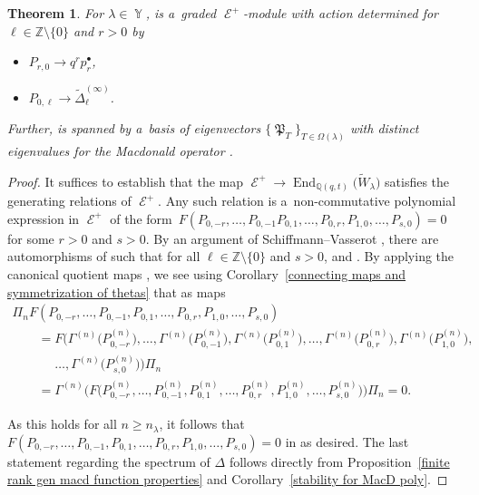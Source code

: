 \documentclass[pdftex]{sigma}
\numberwithin{equation}{section}
\newtheorem{Theorem}{Theorem}[section]
\theoremstyle{definition}
\DeclareMathOperator{\Par}{\mathbb{Y}}
\DeclareMathOperator{\sD}{\mathscr{D}}
\DeclareMathOperator{\MacD}{\mathfrak{P}}
\DeclareMathOperator{\sE}{\mathcal{E}}
\DeclareMathOperator{\End}{\mathrm{End}}
\begin{document}
\begin{Theorem} \label{positive EHA module}
 For $\lambda \in \Par$,  is a~graded $\sE^{+}$-module with action determined for $\ell \in \mathbb{Z}\setminus \{0\}$ and $r>0$ by
 \begin{itemize}
\itemsep=0pt
 \item $P_{r,0} \rightarrow q^{r} p_{r}^{\bullet}$,
 \item $P_{0,\ell} \rightarrow \widetilde{\Delta}_{\ell}^{(\infty)}$.
 \end{itemize}
 Further,  is spanned by a~basis of eigenvectors $\{ \MacD_{T}\}_{T \in \Omega(\lambda)}$ with distinct eigenvalues for the Macdonald operator .
\end{Theorem}
\begin{proof}
It suffices to establish that the map $\sE^{+} \rightarrow \End_{\mathbb{Q}(q,t)}\bigl(\widetilde{W}_{\lambda}\bigr)$ satisfies the generating relations of $\sE^{+}$. Any such relation is a~non-commutative polynomial expression in $\sE^{+}$ of the form~${ F(P_{0,-r},\dots, P_{0,-1}P_{0,1},\dots,P_{0,r},P_{1,0},\dots,P_{s,0}) = 0}
$
for some $r > 0$ and $s>0$. By an argument of Schiffmann--Vasserot \cite[Lemma 1.3]{SV}, there are automorphisms  of \smash{$\sD_n^{\mathrm{sph}}$} such that for all $\ell \in \mathbb{Z}\setminus \{0\}$ and $s>0$,
 and . By applying the canonical quotient maps , we see using Corollary~\ref{connecting maps and symmetrization of thetas} that as maps
\begin{gather*}
\Pi_nF(P_{0,-r},\dots, P_{0,-1},P_{0,1},\dots,P_{0,r},P_{1,0},\dots,P_{s,0}) \\
\qquad=F\bigl(\Gamma^{(n)}\bigl(P^{(n)}_{0,-r}\bigr),\dots,\Gamma^{(n)}\bigl(P^{(n)}_{0,-1}\bigr),\Gamma^{(n)}\bigl(P^{(n)}_{0,1}\bigr), \dots, \Gamma^{(n)}\bigl(P^{(n)}_{0,r}\bigr),\Gamma^{(n)}\bigl(P^{(n)}_{1,0}\bigr),\\
\phantom{\qquad=}{}\dots,\Gamma^{(n)}\bigl(P^{(n)}_{s,0}\bigr)\bigr)\Pi_n \\
\qquad= \Gamma^{(n)}\bigl(F\bigl(P^{(n)}_{0,-r},\dots, P^{(n)}_{0,-1},P^{(n)}_{0,1},\dots,P^{(n)}_{0,r},P^{(n)}_{1,0},\dots,P^{(n)}_{s,0}\bigr)\bigr) \Pi_n = 0.
\end{gather*}

As this holds for all $n \geq n_{\lambda}$, it follows that $F(P_{0,-r},\dots, P_{0,-1},P_{0,1},\dots,P_{0,r},P_{1,0},\dots,P_{s,0}) = 0$ in \smash{$\End_{\mathbb{Q}(q,t)}\bigl(\widetilde{W}_{\lambda}\bigr)$} as desired. The last statement regarding the spectrum of $\Delta$ follows directly from Proposition~\ref{finite rank gen macd function properties} and Corollary~\ref{stability for MacD poly}.
\end{proof}
\end{document}
